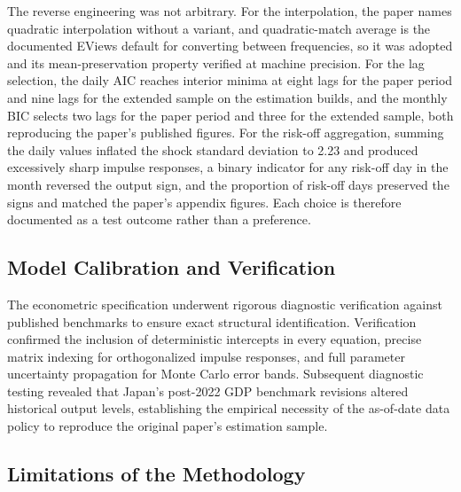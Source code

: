 The reverse engineering was not arbitrary. For the interpolation, the paper names quadratic interpolation without a variant, and quadratic-match average is the documented EViews default for converting between frequencies, so it was adopted and its mean-preservation property verified at machine precision. For the lag selection, the daily AIC reaches interior minima at eight lags for the paper period and nine lags for the extended sample on the estimation builds, and the monthly BIC selects two lags for the paper period and three for the extended sample, both reproducing the paper's published figures. For the risk-off aggregation, summing the daily values inflated the shock standard deviation to 2.23 and produced excessively sharp impulse responses, a binary indicator for any risk-off day in the month reversed the output sign, and the proportion of risk-off days preserved the signs and matched the paper's appendix figures. Each choice is therefore documented as a test outcome rather than a preference.

\subsection{Model Calibration and Verification}

The econometric specification underwent rigorous diagnostic verification against published benchmarks to ensure exact structural identification. Verification confirmed the inclusion of deterministic intercepts in every equation, precise matrix indexing for orthogonalized impulse responses, and full parameter uncertainty propagation for Monte Carlo error bands. Subsequent diagnostic testing revealed that Japan's post-2022 GDP benchmark revisions altered historical output levels, establishing the empirical necessity of the as-of-date data policy to reproduce the original paper's estimation sample.


\subsection{Limitations of the Methodology}

